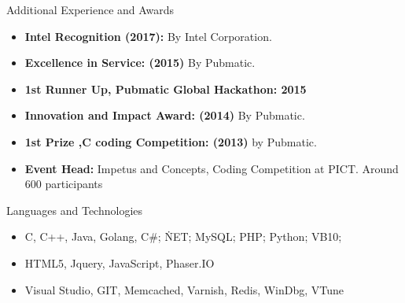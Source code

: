 \documentclass[]{mcdowellcv}
\begin{document}
	\begin{cvsection}{Additional Experience and Awards}
		\begin{cvsubsection}{}{}{}	
			\begin{itemize}
				\item \textbf{Intel Recognition (2017):} By Intel Corporation.
				\item \textbf{Excellence in Service: (2015)} By Pubmatic.
				\item \textbf{1st Runner Up, Pubmatic Global Hackathon: 2015}

				\item \textbf{ Innovation and Impact Award: (2014) } By Pubmatic.
				\item \textbf{1st Prize ,C coding Competition: (2013)} by Pubmatic.
				\item \textbf{Event Head:} Impetus and Concepts, Coding Competition at PICT. Around 600 participants
			\end{itemize}
		\end{cvsubsection}
	\end{cvsection}
	
	\begin{cvsection}{Languages and Technologies}
		\begin{cvsubsection}{}{}{}	
			\begin{itemize}
				\item  C, C++, Java, Golang, C\#; \.NET; MySQL; PHP; Python; VB10; 
				\item HTML5, Jquery, JavaScript, Phaser.IO
				\item Visual Studio, GIT, Memcached, Varnish, Redis, WinDbg, VTune
			\end{itemize}
		\end{cvsubsection}
	\end{cvsection}
	
\end{document}
